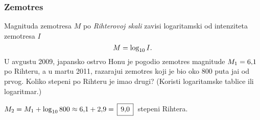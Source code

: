 \subsubsection{Zem{\lj}otres}

\zadatak Magnituda zem{\lj}otresa $M$ po {\sl Rihterovoj skali} zavisi logaritamski od 
inten\-zi\-te\-ta zem{\lj}otresa $I$ 
$$
M=\log_{10} I.
$$
U avgustu 2009, japansko ostrvo Hon{\sv}u 
je pogodio zem{\lj}otres magnitude $M_1=6\.1$ po Rihteru, a u martu 2011,
razaraju{\cc}i zem{\lj}otres koji je bio oko 800 puta ja{\cv}i od prvog. Koliko stepeni po Rihteru je imao drugi?
(Koristi logaritamske tablice ili logaritmar.)

\resenje $M_2 = M_1 + \logten 800\approx 6\.1 + 2\.9 = \ram{9\.0}$ stepeni Rihtera. 
